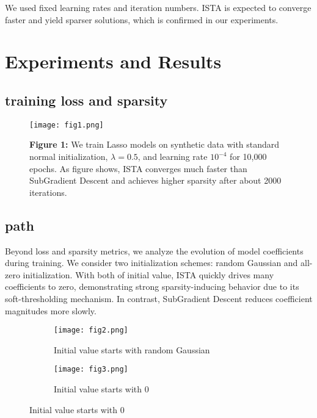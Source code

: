 \documentclass[11pt]{article}
\begin{document}
We used fixed learning rates and iteration numbers. ISTA is expected to converge faster and yield sparser solutions, which is confirmed in our experiments.

\section{Experiments and Results}


\subsection{training loss and sparsity}
\begin{figure}[H]
\centering
\begin{minipage}{0.3\textwidth}
    \texttt{[image: fig1.png]}
\end{minipage}
\hfill
\begin{minipage}{0.5\textwidth}
    \small
    \textbf{Figure 1:} We train Lasso models  on synthetic data with standard normal initialization, \( \lambda = 0.5 \), and learning rate \( 10^{-4} \) for 10,000 epochs. As figure shows, 
ISTA converges much faster than SubGradient Descent and achieves higher sparsity after about 2000 iterations. 
\end{minipage}
\end{figure}


\subsection{path}
Beyond loss and sparsity metrics, we analyze the evolution of model coefficients during training. 
We consider two initialization schemes: random Gaussian and all-zero initialization. With both of initial value, ISTA quickly drives many coefficients to zero, demonstrating strong sparsity-inducing behavior due to its soft-thresholding mechanism. In contrast, SubGradient Descent reduces coefficient magnitudes more slowly. 
\begin{figure}[H]
\centering
\begin{subfigure}[b]{0.45\textwidth}
    \texttt{[image: fig2.png]}
    \caption{Initial value starts with random Gaussian}
    \label{fig:sub1}
\end{subfigure}
\hfill
\begin{subfigure}[b]{0.45\textwidth}
    \texttt{[image: fig3.png]}
    \caption{Initial value starts with 0}
    \label{fig:sub2}
\end{subfigure}
\label{fig:main}
\end{figure}
\end{document}
